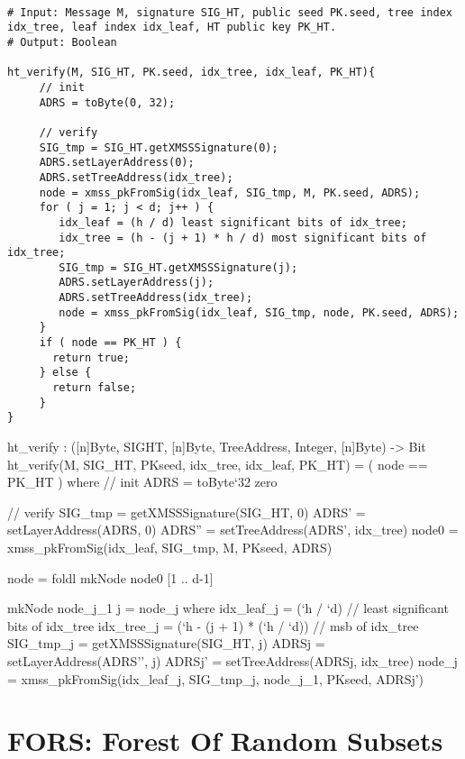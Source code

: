 \begin{lstlisting}[breaklines=true, label=alg:ht:ver, mathescape, language=pseudoc,
                   caption=\htverify\ -- Verifying a \hyper signature \htsig on a
   message \msg using a \hyper public key \htpk]

# Input: Message M, signature SIG_HT, public seed PK.seed, tree index idx_tree, leaf index idx_leaf, HT public key PK_HT.
# Output: Boolean

ht_verify(M, SIG_HT, PK.seed, idx_tree, idx_leaf, PK_HT){
     // init
     ADRS = toByte(0, 32);

     // verify
     SIG_tmp = SIG_HT.getXMSSSignature(0);
     ADRS.setLayerAddress(0);
     ADRS.setTreeAddress(idx_tree);
     node = xmss_pkFromSig(idx_leaf, SIG_tmp, M, PK.seed, ADRS);
     for ( j = 1; j < d; j++ ) {
        idx_leaf = (h / d) least significant bits of idx_tree;
        idx_tree = (h - (j + 1) * h / d) most significant bits of idx_tree;
        SIG_tmp = SIG_HT.getXMSSSignature(j);
        ADRS.setLayerAddress(j);
        ADRS.setTreeAddress(idx_tree);
        node = xmss_pkFromSig(idx_leaf, SIG_tmp, node, PK.seed, ADRS);
     }
     if ( node == PK_HT ) {
       return true;
     } else {
       return false;
     }
}
\end{lstlisting}

\begin{code}
  ht_verify : ([n]Byte, SIGHT, [n]Byte, TreeAddress, Integer, [n]Byte) -> Bit
  ht_verify(M, SIG_HT, PKseed, idx_tree, idx_leaf, PK_HT) = ( node == PK_HT )
    where
    // init
    ADRS = toByte`{32} zero

    // verify
    SIG_tmp = getXMSSSignature(SIG_HT, 0)
    ADRS' = setLayerAddress(ADRS, 0)
    ADRS'' = setTreeAddress(ADRS', idx_tree)
    node0 = xmss_pkFromSig(idx_leaf, SIG_tmp, M, PKseed, ADRS)

    node = foldl mkNode node0 [1 .. d-1]

    mkNode node_j_1 j = node_j where
      idx_leaf_j = (`h / `d) // least significant bits of idx_tree
      idx_tree_j = (`h - (j + 1) * (`h / `d)) // msb of idx_tree
      SIG_tmp_j = getXMSSSignature(SIG_HT, j)
      ADRSj = setLayerAddress(ADRS'', j)
      ADRSj' = setTreeAddress(ADRSj, idx_tree)
      node_j = xmss_pkFromSig(idx_leaf_j, SIG_tmp_j, node_j_1, PKseed, ADRSj')
\end{code}

\section{FORS: Forest Of Random Subsets}

